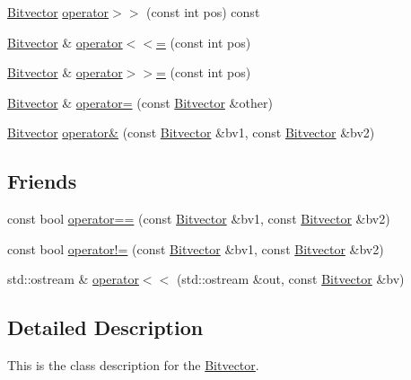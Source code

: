 \begin{DoxyCompactItemize}
\item 
\hyperlink{classprism_1_1_bitvector}{Bitvector} \hyperlink{classprism_1_1_bitvector_a8cb5d12bfecf59503a0e9d9e4bbfa0e8}{operator$>$$>$} (const int pos) const 
\item 
\hyperlink{classprism_1_1_bitvector}{Bitvector} \& \hyperlink{classprism_1_1_bitvector_acf4750aad13fcdb2c1cc3f301ec6debf}{operator$<$$<$=} (const int pos)
\item 
\hyperlink{classprism_1_1_bitvector}{Bitvector} \& \hyperlink{classprism_1_1_bitvector_a540f30c24a85e912c2a5d1d37241b89a}{operator$>$$>$=} (const int pos)
\item 
\hyperlink{classprism_1_1_bitvector}{Bitvector} \& \hyperlink{classprism_1_1_bitvector_a84f45db3420a5ef90d64997823924dc9}{operator=} (const \hyperlink{classprism_1_1_bitvector}{Bitvector} \&other)
\item 
\hyperlink{classprism_1_1_bitvector}{Bitvector} \hyperlink{classprism_1_1_bitvector_a6cdd60018c3f86faeb9090b1beec5a96}{operator\&} (const \hyperlink{classprism_1_1_bitvector}{Bitvector} \&bv1, const \hyperlink{classprism_1_1_bitvector}{Bitvector} \&bv2)
\end{DoxyCompactItemize}
\subsection*{Friends}
\begin{DoxyCompactItemize}
\item 
const bool \hyperlink{classprism_1_1_bitvector_ab73504943fa9f2b6d0bbaef200ba4088}{operator==} (const \hyperlink{classprism_1_1_bitvector}{Bitvector} \&bv1, const \hyperlink{classprism_1_1_bitvector}{Bitvector} \&bv2)
\item 
const bool \hyperlink{classprism_1_1_bitvector_a085f70a7612a9fc1dd410533d09fa6fc}{operator!=} (const \hyperlink{classprism_1_1_bitvector}{Bitvector} \&bv1, const \hyperlink{classprism_1_1_bitvector}{Bitvector} \&bv2)
\item 
std\+::ostream \& \hyperlink{classprism_1_1_bitvector_a5082ad1e850f0d821b1310ab1ff1dc60}{operator$<$$<$} (std\+::ostream \&out, const \hyperlink{classprism_1_1_bitvector}{Bitvector} \&bv)
\end{DoxyCompactItemize}


\subsection{Detailed Description}
This is the class description for the \hyperlink{classprism_1_1_bitvector}{Bitvector}. 

